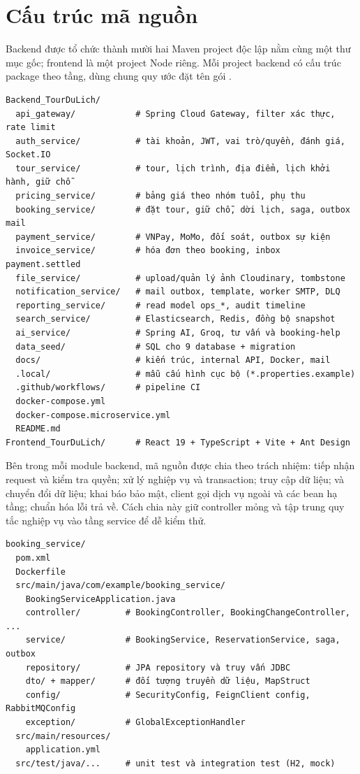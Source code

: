 \section{Cấu trúc mã nguồn}
\label{sec:cau-truc-ma-nguon}

Backend được tổ chức thành mười hai Maven project độc lập nằm cùng một thư mục gốc; frontend là một project Node riêng. Mỗi project backend có cấu trúc package theo tầng, dùng chung quy ước đặt tên gói .

\begin{lstlisting}[style=json,caption={Bố cục thư mục dự án},label={lst:tree}]
Backend_TourDuLich/
  api_gateway/            # Spring Cloud Gateway, filter xác thực, rate limit
  auth_service/           # tài khoản, JWT, vai trò/quyền, đánh giá, Socket.IO
  tour_service/           # tour, lịch trình, địa điểm, lịch khởi hành, giữ chỗ
  pricing_service/        # bảng giá theo nhóm tuổi, phụ thu
  booking_service/        # đặt tour, giữ chỗ, dời lịch, saga, outbox mail
  payment_service/        # VNPay, MoMo, đối soát, outbox sự kiện
  invoice_service/        # hóa đơn theo booking, inbox payment.settled
  file_service/           # upload/quản lý ảnh Cloudinary, tombstone
  notification_service/   # mail outbox, template, worker SMTP, DLQ
  reporting_service/      # read model ops_*, audit timeline
  search_service/         # Elasticsearch, Redis, đồng bộ snapshot
  ai_service/             # Spring AI, Groq, tư vấn và booking-help
  data_seed/              # SQL cho 9 database + migration
  docs/                   # kiến trúc, internal API, Docker, mail
  .local/                 # mẫu cấu hình cục bộ (*.properties.example)
  .github/workflows/      # pipeline CI
  docker-compose.yml
  docker-compose.microservice.yml
  README.md
Frontend_TourDuLich/      # React 19 + TypeScript + Vite + Ant Design
\end{lstlisting}

Bên trong mỗi module backend, mã nguồn được chia theo trách nhiệm:  tiếp nhận request và kiểm tra quyền;  xử lý nghiệp vụ và transaction;  truy cập dữ liệu;  và  chuyển đổi dữ liệu;  khai báo bảo mật, client gọi dịch vụ ngoài và các bean hạ tầng;  chuẩn hóa lỗi trả về. Cách chia này giữ controller mỏng và tập trung quy tắc nghiệp vụ vào tầng service để dễ kiểm thử.

\begin{lstlisting}[style=json,caption={Cấu trúc package tiêu biểu của một module nghiệp vụ},label={lst:package}]
booking_service/
  pom.xml
  Dockerfile
  src/main/java/com/example/booking_service/
    BookingServiceApplication.java
    controller/         # BookingController, BookingChangeController, ...
    service/            # BookingService, ReservationService, saga, outbox
    repository/         # JPA repository và truy vấn JDBC
    dto/ + mapper/      # đối tượng truyền dữ liệu, MapStruct
    config/             # SecurityConfig, FeignClient config, RabbitMQConfig
    exception/          # GlobalExceptionHandler
  src/main/resources/
    application.yml
  src/test/java/...     # unit test và integration test (H2, mock)
\end{lstlisting}

